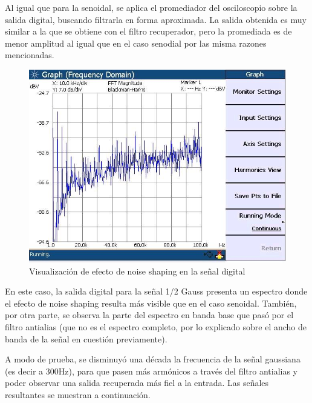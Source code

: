 \documentclass[assd_tp3_main.tex]{subfiles}
\begin{document}
Al igual que para la senoidal, se aplica el promediador del osciloscopio sobre la salida digital, buscando filtrarla en forma aproximada. La salida obtenida es muy similar a la que se obtiene con el filtro recuperador, pero la promediada es de menor amplitud al igual que en el caso senodial por las misma razones mencionadas.

\begin{figure}[!ht]
\begin{centering}
\includegraphics[scale=0.5]{../EJ4/Mediciones/0.5Gauss/s2_ns.jpeg}
\par\end{centering}
\caption{Visualización de efecto de noise shaping en la señal digital}
\end{figure}

En este caso, la salida digital para la señal 1/2 Gauss presenta un espectro donde el efecto de noise shaping resulta más visible que en el caso senoidal. También, por otra parte, se observa la parte del espectro en banda base que pasó por el filtro antialias (que no es el espectro completo, por lo explicado sobre el ancho de banda de la señal en cuestión previamente).

\newpage

A modo de prueba, se disminuyó una década la frecuencia de la señal gaussiana (es decir a 300Hz), para que pasen más armónicos a través del filtro antialias y poder observar una salida recuperada más fiel a la entrada. Las señales resultantes se muestran a continuación.
\end{document}

